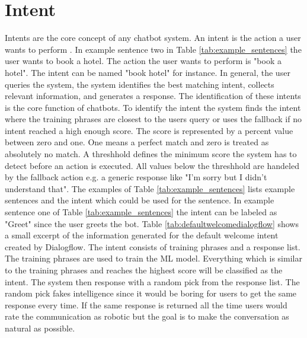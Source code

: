 \section{Intent} \label{sec:intent}
Intents are the core concept of any chatbot system.
An intent is the action a user wants to perform \cite{dutta2017developing, rahman2017programming}.
In example sentence two in Table \ref{tab:example_sentences} the user wants to book a hotel.
The action the user wants to perform is "book a hotel".
The intent can be named "book hotel" for instance.
In general, the user queries the system, the system identifies the best matching intent, 
collects relevant information, and generates a response.
The identification of these intents is the core function of chatbots.
To identify the intent the system finds the intent where the training phrases are closest to 
the users query or uses the fallback if no intent reached a high enough score.
The score is represented by a percent value between zero and one.
One means a perfect match and zero is treated as absolutely no match.
A threshhold defines the minimum score the system has to detect before an action is executed.
All values below the threshhold are handeled by the fallback action e.g. a generic response like 
"I'm sorry but I didn't understand that".
The examples of Table \ref{tab:example_sentences} lists example sentences and the intent which 
could be used for the sentence.
In example sentence one of Table \ref{tab:example_sentences} the intent can be labeled as 
"Greet" since the user greets the bot.
Table \ref{tab:defaultwelcomedialogflow} shows a small excerpt of the information generated for
the default welcome intent created by Dialogflow.
The intent consists of training phrases and a response list.
The training phrases are used to train the ML model.
Everything which is similar to the training phrases and reaches the highest score 
will be classified as the intent.
The system then response with a random pick from the response list.
The random pick fakes intelligence since it would be boring for 
users to get the same response every time.
If the same response is returned all the time users would rate the communication as robotic 
but the goal is to make the conversation as natural as possible.

